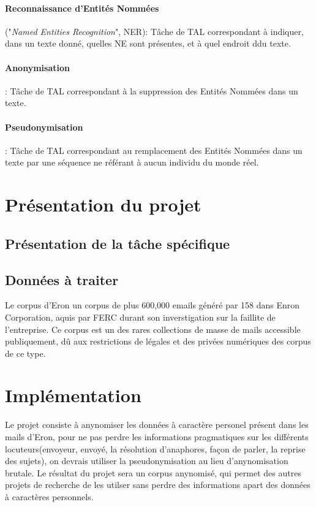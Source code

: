 \documentclass{article}
\begin{document}
\paragraph{Reconnaissance d'Entités Nommées} ("\textit{Named Entities Recognition}", NER): Tâche de TAL correspondant à indiquer, dans un texte donné, quelles NE sont présentes, et à quel endroit ddu texte.
\paragraph{Anonymisation}: Tâche de TAL correspondant à la suppression des Entités Nommées dans un texte.
\paragraph{Pseudonymisation}: Tâche de TAL correspondant au remplacement des Entités Nommées dans un texte par une séquence ne référant à aucun individu du monde réel.


\section{Présentation du projet}
\subsection{Présentation de la tâche spécifique}

\subsection{Données à traiter}
 Le corpus d'Eron un corpus de plus 600,000 emails généré par 158 dans Enron Corporation, aquis par FERC durant son inverstigation sur la faillite de l'entreprise. 
Ce corpus est un des rares collections de masse de mails accessible publiquement, dû aux restrictions de légales et des privées numériques des corpus de ce type.


\section{Implémentation}
Le projet consiste à anynomiser les données à caractère personel présent dans les mails d'Eron, pour ne pas perdre les informations pragmatiques sur les différents locuteurs(envoyeur, envoyé, la résolution d'anaphores, façon de parler, la reprise des sujets), on devrais utiliser la pseudonymisation au lieu d'anynomisation brutale.  
Le résultat du projet sera un corpus anynomisé, qui permet des autres projets de recherche de les utilser sans perdre des informations apart des données à caractères personnels. 
 
\end{document}
